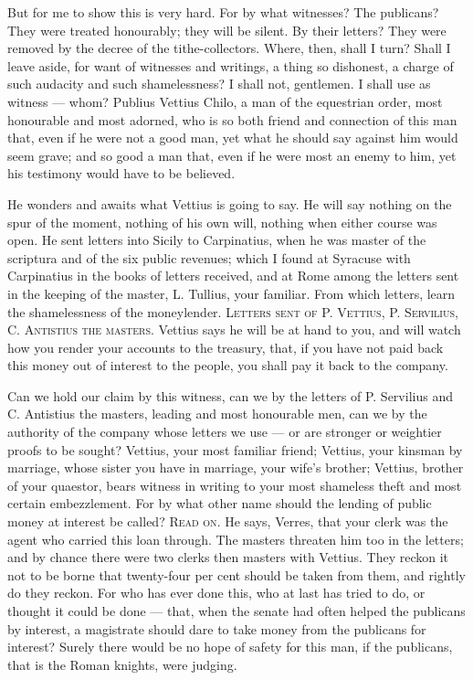  But for me to show this is very hard. For by what witnesses? The publicans? They were treated honourably; they will be silent. By their letters? They were removed by the decree of the tithe-collectors. Where, then, shall I turn? Shall I leave aside, for want of witnesses and writings, a thing so dishonest, a charge of such audacity and such shamelessness? I shall not, gentlemen. I shall use as witness --- whom? Publius Vettius Chilo, a man of the equestrian order, most honourable and most adorned, who is so both friend and connection of this man that, even if he were not a good man, yet what he should say against him would seem grave; and so good a man that, even if he were most an enemy to him, yet his testimony would have to be believed.

 He wonders and awaits what Vettius is going to say. He will say nothing on the spur of the moment, nothing of his own will, nothing when either course was open. He sent letters into Sicily to Carpinatius, when he was master of the scriptura and of the six public revenues; which I found at Syracuse with Carpinatius in the books of letters received, and at Rome among the letters sent in the keeping of the master, L. Tullius, your familiar. From which letters, learn the shamelessness of the moneylender. \textsc{Letters sent of P. Vettius, P. Servilius, C. Antistius the masters}. Vettius says he will be at hand to you, and will watch how you render your accounts to the treasury, that, if you have not paid back this money out of interest to the people, you shall pay it back to the company.

 Can we hold our claim by this witness, can we by the letters of P. Servilius and C. Antistius the masters, leading and most honourable men, can we by the authority of the company whose letters we use --- or are stronger or weightier proofs to be sought? Vettius, your most familiar friend; Vettius, your kinsman by marriage, whose sister you have in marriage, your wife's brother; Vettius, brother of your quaestor, bears witness in writing to your most shameless theft and most certain embezzlement. For by what other name should the lending of public money at interest be called? \textsc{Read on}. He says, Verres, that your clerk was the agent who carried this loan through. The masters threaten him too in the letters; and by chance there were two clerks then masters with Vettius. They reckon it not to be borne that twenty-four per cent should be taken from them, and rightly do they reckon. For who has ever done this, who at last has tried to do, or thought it could be done --- that, when the senate had often helped the publicans by interest, a magistrate should dare to take money from the publicans for interest? Surely there would be no hope of safety for this man, if the publicans, that is the Roman knights, were judging.

